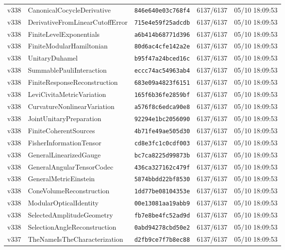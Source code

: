 \documentclass[11pt]{article}
\theoremstyle{definition}\newtheorem{deriv}{Derivation}
\begin{document}
{\begin{longtable}{@{}lllll@{}}
v338 & CanonicalCocycleDerivative & \texttt{846e640e03c768f4} & 6137/6137 & 05/10 18:09:53 \\
v338 & DerivativeFromLinearCutoffError & \texttt{715e4e59f25adcdb} & 6137/6137 & 05/10 18:09:53 \\
v338 & FiniteLevelExponentials & \texttt{a6b414b68771d396} & 6137/6137 & 05/10 18:09:53 \\
v338 & FiniteModularHamiltonian & \texttt{80d6ac4cfe142a2e} & 6137/6137 & 05/10 18:09:53 \\
v338 & UnitaryDuhamel & \texttt{b95f47a24bced16c} & 6137/6137 & 05/10 18:09:53 \\
v338 & SummablePauliInteraction & \texttt{eccc74ac54963ab4} & 6137/6137 & 05/10 18:09:53 \\
v338 & FiniteResponseReconstruction & \texttt{683e09a4823f6151} & 6137/6137 & 05/10 18:09:53 \\
v338 & LeviCivitaMetricVariation & \texttt{165f6b36fe2859bf} & 6137/6137 & 05/10 18:09:53 \\
v338 & CurvatureNonlinearVariation & \texttt{a576f8c6edca90e8} & 6137/6137 & 05/10 18:09:53 \\
v338 & JointUnitaryPreparation & \texttt{92294e1bc2056090} & 6137/6137 & 05/10 18:09:53 \\
v338 & FiniteCoherentSources & \texttt{4b71fe49ae505d30} & 6137/6137 & 05/10 18:09:53 \\
v338 & FisherInformationTensor & \texttt{cd8e3fc1c0cdf003} & 6137/6137 & 05/10 18:09:53 \\
v338 & GeneralLinearizedGauge & \texttt{bc7ca8225d99873b} & 6137/6137 & 05/10 18:09:53 \\
v338 & GeneralAngularTensorCodec & \texttt{436ca327162c479f} & 6137/6137 & 05/10 18:09:53 \\
v338 & GeneralMetricEinstein & \texttt{5874bbdd22bf8530} & 6137/6137 & 05/10 18:09:53 \\
v338 & ConeVolumeReconstruction & \texttt{1dd77be08104353e} & 6137/6137 & 05/10 18:09:53 \\
v338 & ModularOpticalIdentity & \texttt{00e13081aa19abb9} & 6137/6137 & 05/10 18:09:53 \\
v338 & SelectedAmplitudeGeometry & \texttt{fb7e8be4fc52ad9d} & 6137/6137 & 05/10 18:09:53 \\
v338 & SelectionAngleReconstruction & \texttt{0abd94278cbd50e2} & 6137/6137 & 05/10 18:09:53 \\
v337 & TheNameIsTheCharacterization & \texttt{d2fb9ce7f7b8ec88} & 6137/6137 & 05/10 18:09:53 \\

\end{longtable}}
\end{document}
